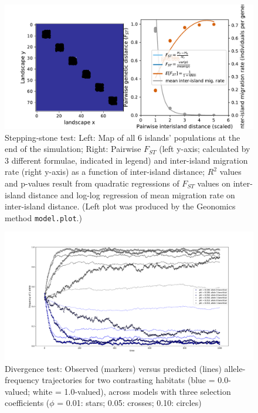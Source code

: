 ﻿\documentclass{article}
\begin{document}
\begin{figure}[!p]
        \includegraphics[width=190mm]{./img/final/STEPPING_STONE_pop_plot_and_Fst_vs_mig_rate.pdf}
        \caption{Stepping-stone test: Left: Map of all 6 islands' populations
                 at the end of the simulation;
                 Right: Pairwise $F_{ST}$
                 (left y-axis; calculated by 3 different formulae, indicated in legend)
                 and inter-island migration rate (right y-axis)
                 as a function of inter-island distance;
                 $R^{2}$ values and p-values result from quadratic regressions
                 of $F_{ST}$ values on inter-island distance and
                 log-log regression of mean migration rate on inter-island distance.
                 (Left plot was produced by the Geonomics method
                 \texttt{model.plot}.)}
        \label{fig:stepstone_pop_and_Fst_mig_expecs}
\end{figure}


\begin{figure}[!p]
        \includegraphics[width=175mm]{./img/final/DIVERGENCE_allele_freqs.pdf}
        \caption{Divergence test: Observed (markers) versus predicted (lines)
                 allele-frequency trajectories for two contrasting habitats
                 (blue = 0.0-valued; white = 1.0-valued),
                 across models with three selection coefficients
                 ($\phi$ = 0.01: stars; 0.05: crosses; 0.10: circles)}
        \label{fig:div_freqs}
\end{figure}
\end{document}
